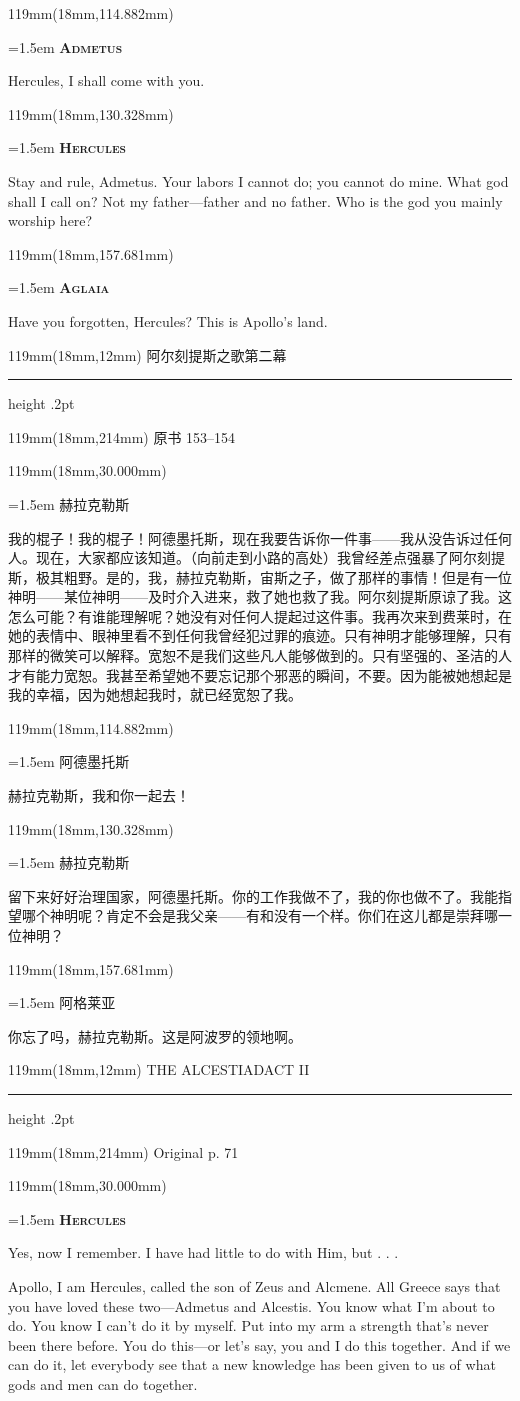 \documentclass{article}
\newcommand{\ENsetup}{\normalfont\color{ink}\fontsize{11}{16.5}\selectfont\emergencystretch=1.5em}
\newcommand{\ZHsetup}{\normalfont\color{ink}\fontsize{10.5}{17}\selectfont\emergencystretch=1.5em}
\newcommand{\ENspeaker}[1]{{\fontsize{9.8}{13}\selectfont\scshape\bfseries #1}\par\vspace{3pt}}
\newcommand{\ZHspeaker}[1]{{\hei\fontsize{10.3}{13}\selectfont #1}\par\vspace{3pt}}
\newcommand{\ENstage}[1]{\par\noindent{\itshape #1}\par}
\newcommand{\Block}[3]{\begin{textblock*}{119mm}(18mm,#1mm){#2 #3\par}\end{textblock*}}
\newcommand{\Heading}[3]{%
  \begin{textblock*}{119mm}(18mm,12mm)
    \color{quiet}\fontsize{7.5}{10}\selectfont
    #1\hfill #2\par\vspace{3mm}\hrule height .2pt
  \end{textblock*}
  \begin{textblock*}{119mm}(18mm,214mm)
    \color{quiet}\fontsize{7}{10}\selectfont #3\hfill\thepage
  \end{textblock*}
}
\begin{document}
\Block{114.882}{\ENsetup}{\ENspeaker{Admetus}
Hercules, I shall come with you.\par}
\Block{130.328}{\ENsetup}{\ENspeaker{Hercules}
Stay and rule, Admetus. Your labors I cannot do; you cannot do mine. What god shall I call on? Not my father—father and no father. Who is the god you mainly worship here?\par}
\Block{157.681}{\ENsetup}{\ENspeaker{Aglaia}
Have you forgotten, Hercules? This is Apollo's land.\par}
\newpage
\null
\Heading{阿尔刻提斯之歌}{第二幕}{原书 153–154}
\Block{30.000}{\ZHsetup}{\ZHspeaker{赫拉克勒斯}我的棍子！我的棍子！阿德墨托斯，现在我要告诉你一件事——我从没告诉过任何人。现在，大家都应该知道。{\kai （向前走到小路的高处）}我曾经差点强暴了阿尔刻提斯，极其粗野。是的，我，赫拉克勒斯，宙斯之子，做了那样的事情！但是有一位神明——某位神明——及时介入进来，救了她也救了我。阿尔刻提斯原谅了我。这怎么可能？有谁能理解呢？她没有对任何人提起过这件事。我再次来到费莱时，在她的表情中、眼神里看不到任何我曾经犯过罪的痕迹。只有神明才能够理解，只有那样的微笑可以解释。宽恕不是我们这些凡人能够做到的。只有坚强的、圣洁的人才有能力宽恕。我甚至希望她不要忘记那个邪恶的瞬间，不要。因为能被她想起是我的幸福，因为她想起我时，就已经宽恕了我。\par }
\Block{114.882}{\ZHsetup}{\ZHspeaker{阿德墨托斯}赫拉克勒斯，我和你一起去！\par }
\Block{130.328}{\ZHsetup}{\ZHspeaker{赫拉克勒斯}留下来好好治理国家，阿德墨托斯。你的工作我做不了，我的你也做不了。我能指望哪个神明呢？肯定不会是我父亲——有和没有一个样。你们在这儿都是崇拜哪一位神明？\par }
\Block{157.681}{\ZHsetup}{\ZHspeaker{阿格莱亚}你忘了吗，赫拉克勒斯。这是阿波罗的领地啊。\par }
\newpage
\null
\Heading{THE ALCESTIAD}{ACT II}{Original p. 71}
\Block{30.000}{\ENsetup}{\ENspeaker{Hercules}
Yes, now I remember. I have had little to do with Him, but . . .\par
\ENstage{Looking to heaven.}
Apollo, I am Hercules, called the son of Zeus and Alcmene. All Greece says that you have loved these two—Admetus and Alcestis. You know what I'm about to do. You know I can't do it by myself. Put into my arm a strength that's never been there before. You do this—or let's say, you and I do this together. And if we can do it, let everybody see that a new knowledge has been given to us of what gods and men can do together.\par}
\end{document}
